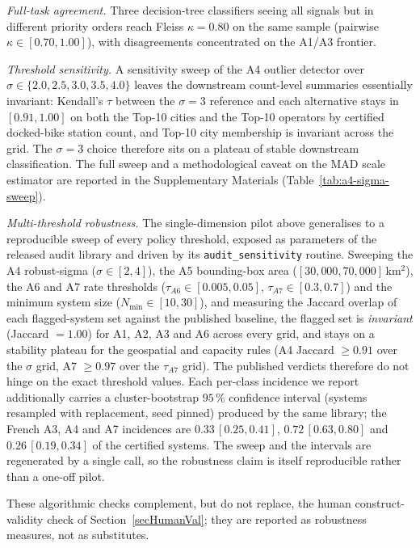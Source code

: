 \documentclass[11pt,a4paper]{article}
\begin{document}
\emph{Full-task agreement.} Three decision-tree classifiers seeing all
signals but in different priority orders reach Fleiss $\kappa = 0.80$
on the same sample (pairwise $\kappa \in [0.70, 1.00]$), with
disagreements concentrated on the A1/A3 frontier.

\emph{Threshold sensitivity.} A sensitivity sweep of the A4 outlier
detector over $\sigma \in \{2.0, 2.5, 3.0, 3.5, 4.0\}$ leaves the
downstream count-level summaries essentially invariant: Kendall's
$\tau$ between the $\sigma = 3$ reference and each alternative stays in
$[0.91, 1.00]$ on both the Top-10 cities and the Top-10 operators by
certified docked-bike station count, and Top-10 city membership is
invariant across the grid. The $\sigma = 3$ choice therefore sits on a
plateau of stable downstream classification. The full sweep and a
methodological caveat on the MAD scale estimator are reported in the
Supplementary Materials (Table~\ref{tab:a4-sigma-sweep}).

\emph{Multi-threshold robustness.} The single-dimension pilot above
generalises to a reproducible sweep of every policy threshold, exposed as
parameters of the released audit library and driven by its
\texttt{audit\_sensitivity} routine. Sweeping the A4 robust-sigma
($\sigma \in [2, 4]$), the A5 bounding-box area
($[30{,}000, 70{,}000]$\,km$^2$), the A6 and A7 rate thresholds
($\tau_{A6} \in [0.005, 0.05]$, $\tau_{A7} \in [0.3, 0.7]$) and the
minimum system size ($N_{\min} \in [10, 30]$), and measuring the Jaccard
overlap of each flagged-system set against the published baseline, the
flagged set is \emph{invariant} (Jaccard $= 1.00$) for A1, A2, A3 and A6
across every grid, and stays on a stability plateau for the geospatial and
capacity rules (A4 Jaccard $\ge 0.91$ over the $\sigma$ grid, A7
$\ge 0.97$ over the $\tau_{A7}$ grid). The published verdicts therefore do
not hinge on the exact threshold values. Each per-class incidence we
report additionally carries a cluster-bootstrap $95\,\%$ confidence
interval (systems resampled with replacement, seed pinned) produced by the
same library; the French A3, A4 and A7 incidences are
$0.33\,[0.25, 0.41]$, $0.72\,[0.63, 0.80]$ and $0.26\,[0.19, 0.34]$ of the
certified systems. The sweep and the intervals are regenerated by a single
call, so the robustness claim is itself reproducible rather than a
one-off pilot.

These algorithmic checks complement, but do not replace, the human
construct-validity check of Section~\ref{secHumanVal}; they are reported
as robustness measures, not as substitutes.
\end{document}
